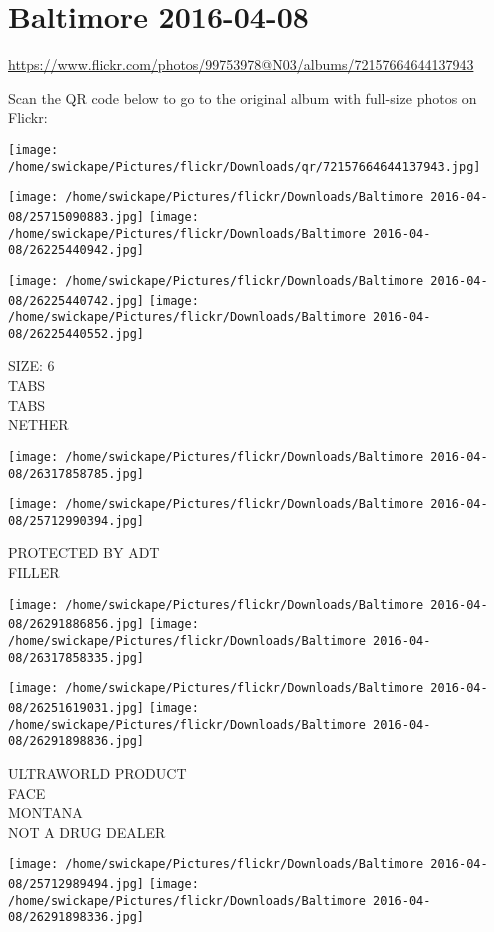\documentclass[10pt,letterpaper]{article}
\title{}
\author{}
\date{}
\begin{document}
\section*{Baltimore 2016-04-08}

\url{https://www.flickr.com/photos/99753978@N03/albums/72157664644137943}

Scan the QR code below to go to the original album with full-size photos on Flickr:

\texttt{[image: /home/swickape/Pictures/flickr/Downloads/qr/72157664644137943.jpg]}
\pagebreak

\texttt{[image: /home/swickape/Pictures/flickr/Downloads/Baltimore 2016-04-08/25715090883.jpg]}
\texttt{[image: /home/swickape/Pictures/flickr/Downloads/Baltimore 2016-04-08/26225440942.jpg]}

\texttt{[image: /home/swickape/Pictures/flickr/Downloads/Baltimore 2016-04-08/26225440742.jpg]}
\texttt{[image: /home/swickape/Pictures/flickr/Downloads/Baltimore 2016-04-08/26225440552.jpg]}

SIZE: 6\\
TABS\\
TABS\\
NETHER
\pagebreak

\texttt{[image: /home/swickape/Pictures/flickr/Downloads/Baltimore 2016-04-08/26317858785.jpg]}

\vspace{0.25in}
\texttt{[image: /home/swickape/Pictures/flickr/Downloads/Baltimore 2016-04-08/25712990394.jpg]}

PROTECTED BY ADT\\
FILLER
\pagebreak

\texttt{[image: /home/swickape/Pictures/flickr/Downloads/Baltimore 2016-04-08/26291886856.jpg]}
\texttt{[image: /home/swickape/Pictures/flickr/Downloads/Baltimore 2016-04-08/26317858335.jpg]}

\texttt{[image: /home/swickape/Pictures/flickr/Downloads/Baltimore 2016-04-08/26251619031.jpg]}
\texttt{[image: /home/swickape/Pictures/flickr/Downloads/Baltimore 2016-04-08/26291898836.jpg]}

ULTRAWORLD PRODUCT\\
FACE\\
MONTANA\\
NOT A DRUG DEALER
\pagebreak

\texttt{[image: /home/swickape/Pictures/flickr/Downloads/Baltimore 2016-04-08/25712989494.jpg]}
\texttt{[image: /home/swickape/Pictures/flickr/Downloads/Baltimore 2016-04-08/26291898336.jpg]}
\end{document}
